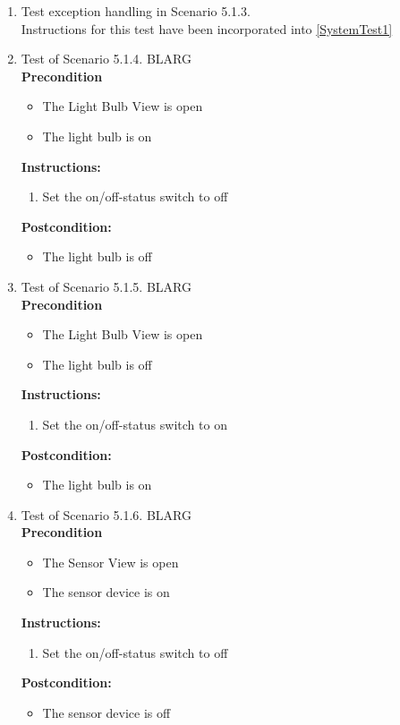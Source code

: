\documentclass[a4paper]{article}
\newlength{\testlabellength}
\newenvironment{testlist}{\begin{enumerate}[label=\bfseries Instruction \thesubsection.\arabic* , labelindent=0pt, labelwidth=\testlabellength , leftmargin=2cm]}{\end{enumerate}}
\newenvironment{precondition}{
{\color{white}BLARG}\\ 
\textbf{Precondition}
\begin{itemize}[labelindent=0cm, labelwidth=2cm , leftmargin=1cm]
}
{\end{itemize}}
\newenvironment{instruction}{
\textbf{Instructions:}
\begin{enumerate}[label=\bfseries  \arabic*., labelindent=0cm, labelwidth=2cm , leftmargin=1cm]
}
{\end{enumerate}}
\newenvironment{postcondition}{
\textbf{Postcondition:}
\begin{itemize}[labelindent=0cm, labelwidth=2cm , leftmargin=1cm]
}
{\end{itemize}}
\begin{document}
\begin{appendices}
\begin{testlist}
	\item  Test exception handling in Scenario 5.1.3. \\
		Instructions for this test have been incorporated into \ref{SystemTest1}

	\item  Test of Scenario 5.1.4.
		\begin{precondition}
			\item The Light Bulb View is open
			\item The light bulb is on
		\end{precondition}
		\begin{instruction}
			\item Set the on/off-status switch to off
		\end{instruction}
		\begin{postcondition}
			\item The light bulb is off
		\end{postcondition}
\newpage
	\item  Test of Scenario 5.1.5.
		\begin{precondition}
			\item The Light Bulb View is open
			\item The light bulb is off
		\end{precondition}
		\begin{instruction}
			\item Set the on/off-status switch to on
		\end{instruction}
		\begin{postcondition}
			\item The light bulb is on
		\end{postcondition}

	\item  Test of Scenario 5.1.6.
		\begin{precondition}
			\item The Sensor View is open
			\item The sensor device is on
		\end{precondition}
		\begin{instruction}
			\item Set the on/off-status switch to off
		\end{instruction}
		\begin{postcondition}
			\item The sensor device is off
		\end{postcondition}


\end{testlist}
\end{appendices}
\end{document}
